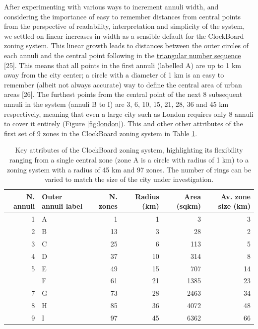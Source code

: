\documentclass{josis}
\begin{document}
After experimenting with various ways to increment annuli width,
and considering the importance of easy to remember distances from central points from the perspective of readability, interpretation and simplicity of the system, we settled on linear increases in width as a sensible default for the ClockBoard zoning system.
This linear growth leads to distances between the outer circles of each annuli and the central point following in the \href{https://en.wikipedia.org/wiki/Triangular_number}{triangular number sequence} {[}25{]}.
This means that all points in the first annuli (labelled A) are up to 1 km away from the city center; a circle with a diameter of 1 km is an easy to remember (albeit not always accurate) way to define the central area of urban areas {[}26{]}.
The furthest points from the central point of the next 8 subsequent annuli in the system (annuli B to I) are 3, 6, 10, 15, 21, 28, 36 and 45 km respectively, meaning that even a large city such as London requires only 8 annuli to cover it entirely (Figure \ref{fig:london}).
This and other other attributes of the first set of 9 zones in the ClockBoard zoning system in Table \ref{tab:t1}.

\begin{table}

\caption{\label{tab:t1}Key attributes of the ClockBoard zoning system, highlighting its flexibility ranging from a single central zone (zone A is a circle with radius of 1 km) to a zoning system with a radius of 45 km and 97 zones. The number of rings can be varied to match the size of the city under investigation.}
\centering
\begin{tabular}[t]{rlrrrr}
\toprule
N. annuli & Outer annuli label & N. zones & Radius (km) & Area (sqkm) & Av. zone size (km)\\
\midrule
1 & A & 1 & 1 & 3 & 3\\
2 & B & 13 & 3 & 28 & 2\\
3 & C & 25 & 6 & 113 & 5\\
4 & D & 37 & 10 & 314 & 8\\
5 & E & 49 & 15 & 707 & 14\\
\addlinespace
6 & F & 61 & 21 & 1385 & 23\\
7 & G & 73 & 28 & 2463 & 34\\
8 & H & 85 & 36 & 4072 & 48\\
9 & I & 97 & 45 & 6362 & 66\\
\bottomrule
\end{tabular}
\end{table}
\end{document}
